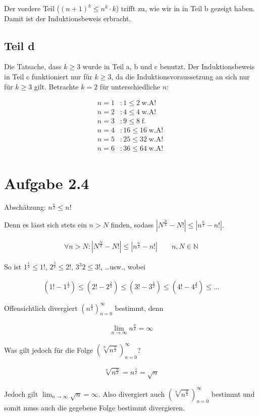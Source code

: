 \documentclass[a4paper,german,12pt,smallheadings]{scrartcl}
\begin{document}
Der vordere Teil ($(n+1)^k \le n^k \cdot k$) trifft zu, wie wir in in Teil b gezeigt haben. Damit ist der Induktionsbeweis erbracht.
\subsection*{Teil d}

Die Tatsache, dass $k \ge 3$ wurde in Teil a, b und c benutzt. Der Induktionsbeweis in Teil c funktioniert nur für $k \ge 3$, da die Induktionsvoraussetzung an sich nur für $k \ge 3$ gilt. Betrachte $k=2$ für unterschiedliche $n$:

\begin{align*}
  n=1&: 1 \le 2 \operatorname{w.A!}\\
  n=2&: 4 \le 4 \operatorname{w.A!}\\
  n=3&: 9 \le 8 \operatorname{f.}\\
  n=4&: 16 \le 16 \operatorname{w.A!}\\
  n=5&: 25 \le 32 \operatorname{w.A!}\\
  n=6&: 36 \le 64 \operatorname{w.A!}
\end{align*}

\section*{Aufgabe 2.4}
Abschätzung: $n^\frac{n}{2} \le n!$

Denn es lässt sich stets ein $n > N$ finden, sodass $|N^{\frac{N}{2}} - N!| \le
|n^\frac{n}{2} - n!|$.

\begin{align*}
  \forall n > N: |N^\frac{N}{2} - N!| \le |n^\frac{n}{2} - n!| \qquad n,N \in \mathbb{N}
\end{align*}

So ist $1^\frac{1}{2} \le 1!$, $2^{\frac{2}{2}} \le 2!$, $3^{3}{2} \le 3!$, \dots usw., wobei

\begin{align*}
  (1! - 1^{\frac{1}{2}}) \le (2! - 2^{\frac{2}{2}}) \le (3! - 3^{\frac{3}{2}}) \le (4! - 4^{\frac{4}{2}}) \le \dots
\end{align*}

Offensichtlich divergiert $\left(n^\frac{n}{2}\right)_{n=0}^{\infty}$ bestimmt, denn

\begin{align*}
  \lim_{n \to \infty} n^\frac{n}{2} = \infty
\end{align*}

Was gilt jedoch für die Folge $\left( \sqrt[n]{n^\frac{n}{2}} \right)_{n=0}^{\infty}$?

\begin{align*}
  \sqrt[n]{n^{\frac{n}{2}}} = n^\frac{1}{2} = \sqrt{n}
\end{align*}

Jedoch gilt $\lim_{n \to \infty} \sqrt{n} = \infty$. Also divergiert auch
$\left( \sqrt[n]{n^{\frac{n}{2}}} \right)_{n=0}^{\infty}$ bestimmt und somit
muss auch die gegebene Folge bestimmt divergieren.
\end{document}
